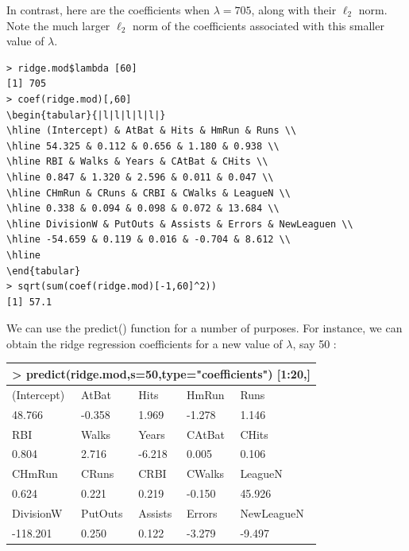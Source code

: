 \documentclass[10pt]{article}
\begin{document}
In contrast, here are the coefficients when $\lambda=705$, along with their $\ell_{2}$ norm. Note the much larger $\ell_{2}$ norm of the coefficients associated with this smaller value of $\lambda$.

\begin{verbatim}
> ridge.mod$lambda [60]
[1] 705
> coef(ridge.mod)[,60]
\begin{tabular}{|l|l|l|l|l|}
\hline (Intercept) & AtBat & Hits & HmRun & Runs \\
\hline 54.325 & 0.112 & 0.656 & 1.180 & 0.938 \\
\hline RBI & Walks & Years & CAtBat & CHits \\
\hline 0.847 & 1.320 & 2.596 & 0.011 & 0.047 \\
\hline CHmRun & CRuns & CRBI & CWalks & LeagueN \\
\hline 0.338 & 0.094 & 0.098 & 0.072 & 13.684 \\
\hline DivisionW & PutOuts & Assists & Errors & NewLeaguen \\
\hline -54.659 & 0.119 & 0.016 & -0.704 & 8.612 \\
\hline
\end{tabular}
> sqrt(sum(coef(ridge.mod)[-1,60]^2))
[1] 57.1
\end{verbatim}

We can use the predict() function for a number of purposes. For instance, we can obtain the ridge regression coefficients for a new value of $\lambda$, say 50 :

\begin{center}
\begin{tabular}{|l|l|l|l|l|}
\hline
\multicolumn{5}{|l|}{> predict(ridge.mod,s=50,type="coefficients") [1:20,]} \\
\hline
(Intercept) & AtBat & Hits & HmRun & Runs \\
\hline
48.766 & -0.358 & 1.969 & -1.278 & 1.146 \\
\hline
RBI & Walks & Years & CAtBat & CHits \\
\hline
0.804 & 2.716 & -6.218 & 0.005 & 0.106 \\
\hline
CHmRun & CRuns & CRBI & CWalks & LeagueN \\
\hline
0.624 & 0.221 & 0.219 & -0.150 & 45.926 \\
\hline
DivisionW & PutOuts & Assists & Errors & NewLeagueN \\
\hline
-118.201 & 0.250 & 0.122 & -3.279 & -9.497 \\
\hline
\end{tabular}
\end{center}
\end{document}
